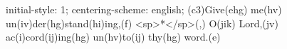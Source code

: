 initial-style: 1;
centering-scheme: english;
(c3)Give(ehg) me(hv) un(iv)der(hg)stand(hi)ing,(f) <sp>*</sp>(,) O(jik) Lord,(jv) ac(i)cord(ij)ing(hg) un(hv)to(ij) thy(hg) word.(e)
